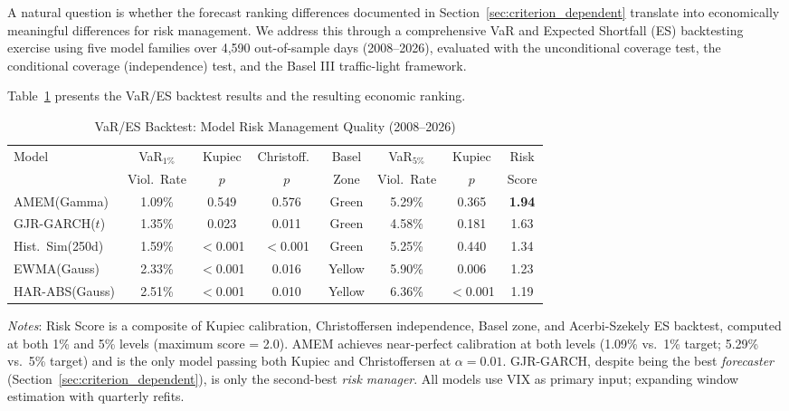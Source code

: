 \documentclass[12pt,a4paper]{article}
\begin{document}
A natural question is whether the forecast ranking differences documented in Section~\ref{sec:criterion_dependent} translate into economically meaningful differences for risk management. We address this through a comprehensive VaR and Expected Shortfall (ES) backtesting exercise using five model families over 4,590 out-of-sample days (2008--2026), evaluated with the \citet{kupiec1995} unconditional coverage test, the \citet{christoffersen1998} conditional coverage (independence) test, and the Basel III traffic-light framework.

Table~\ref{tab:var_backtest} presents the VaR/ES backtest results and the resulting economic ranking.

\begin{table}[H]
\centering
\small
\begin{threeparttable}
\caption{VaR/ES Backtest: Model Risk Management Quality (2008--2026)}
\label{tab:var_backtest}
\begin{tabular}{@{}lccccccc@{}}
\toprule
Model & VaR$_{1\%}$ & Kupiec & Christoff.\ & Basel & VaR$_{5\%}$ & Kupiec & Risk \\
 & Viol.\ Rate & $p$ & $p$ & Zone & Viol.\ Rate & $p$ & Score \\
\midrule
AMEM(Gamma) & 1.09\% & 0.549 & 0.576 & Green & 5.29\% & 0.365 & \textbf{1.94} \\
GJR-GARCH($t$) & 1.35\% & 0.023 & 0.011 & Green & 4.58\% & 0.181 & 1.63 \\
Hist.\ Sim(250d) & 1.59\% & $<$0.001 & $<$0.001 & Green & 5.25\% & 0.440 & 1.34 \\
EWMA(Gauss) & 2.33\% & $<$0.001 & 0.016 & Yellow & 5.90\% & 0.006 & 1.23 \\
HAR-ABS(Gauss) & 2.51\% & $<$0.001 & 0.010 & Yellow & 6.36\% & $<$0.001 & 1.19 \\
\bottomrule
\end{tabular}
\begin{tablenotes}
\small
\item \textit{Notes}: Risk Score is a composite of Kupiec calibration, Christoffersen independence, Basel zone, and Acerbi-Szekely ES backtest, computed at both 1\% and 5\% levels (maximum score = 2.0). AMEM achieves near-perfect calibration at both levels (1.09\% vs.\ 1\% target; 5.29\% vs.\ 5\% target) and is the only model passing both Kupiec and Christoffersen at $\alpha = 0.01$. GJR-GARCH, despite being the best \emph{forecaster} (Section~\ref{sec:criterion_dependent}), is only the second-best \emph{risk manager}. All models use VIX as primary input; expanding window estimation with quarterly refits.
\end{tablenotes}
\end{threeparttable}
\end{table}
\end{document}
